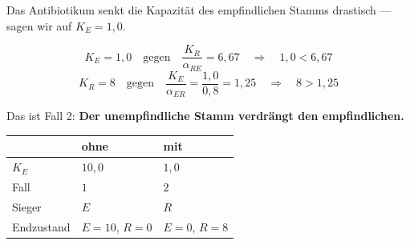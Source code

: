 \begin{merksatz}
Das Antibiotikum senkt die Kapazität des empfindlichen Stamms drastisch --- sagen wir auf $K_E = 1{,}0$.

\[ K_E = 1{,}0 \quad\text{gegen}\quad \frac{K_R}{\alpha_{RE}} = 6{,}67 \quad\Longrightarrow\quad 1{,}0 < 6{,}67 \]
\[ K_R = 8 \quad\text{gegen}\quad \frac{K_E}{\alpha_{ER}} = \frac{1{,}0}{0{,}8} = 1{,}25 \quad\Longrightarrow\quad 8 > 1{,}25 \]

Das ist Fall 2: \textbf{Der unempfindliche Stamm verdrängt den empfindlichen.}

\begin{center}
\renewcommand{\arraystretch}{1.48}
\begin{tabular}{@{}P{2.8cm}P{2.4cm}P{2.4cm}@{}}
\toprule
& \textbf{ohne} & \textbf{mit}\\
\midrule
$K_E$ & $10{,}0$ & $1{,}0$\\
Fall & $1$ & $2$\\
Sieger & $E$ & \textcolor{akzent}{$R$}\\
Endzustand & $E = 10$, $R = 0$ & $E = 0$, $R = 8$\\
\bottomrule
\end{tabular}
\end{center}

\begin{center}
\begin{minipage}{0.88\textwidth}
\end{minipage}
\end{center}
\end{merksatz}

